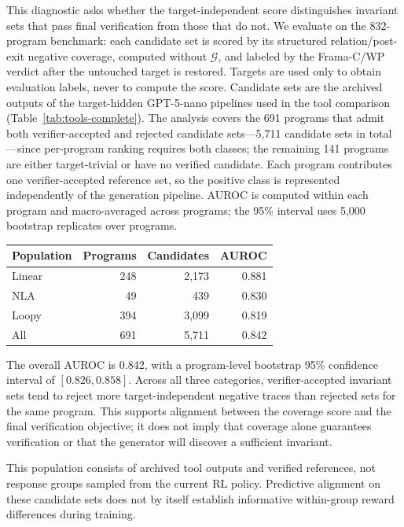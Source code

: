 This diagnostic asks whether the target-independent score distinguishes
invariant sets that pass final verification from those that do not.  We
evaluate on the 832-program benchmark: each candidate set is scored by its
structured relation/post-exit negative coverage, computed without
\(\mathcal G\), and labeled by the Frama-C/WP verdict after the untouched
target is restored.  Targets are used only to obtain evaluation labels,
never to compute the score.  Candidate sets are the archived outputs of the
target-hidden GPT-5-nano pipelines used in the tool comparison
(Table~\ref{tab:tools-complete}).  The analysis covers the 691 programs that admit both verifier-accepted and
rejected candidate sets---5,711 candidate sets in total---since per-program
ranking requires both classes; the remaining 141 programs are either
target-trivial or have no verified candidate.  Each program contributes one
verifier-accepted reference set, so the positive class is represented
independently of the generation pipeline.  AUROC is computed within each
program and macro-averaged across programs; the 95\% interval uses 5,000
bootstrap replicates over programs.

\begin{center}
\small
\setlength{\tabcolsep}{5pt}
\begin{tabular}{lrrr}
\toprule
\rowcolor{algobg}
Population & Programs & Candidates & AUROC \\
\midrule
Linear & 248 & 2,173 & 0.881 \\
NLA & 49 & 439 & 0.830 \\
Loopy & 394 & 3,099 & 0.819 \\
All & 691 & 5,711 & 0.842 \\
\bottomrule
\end{tabular}
\end{center}

The overall AUROC is 0.842, with a program-level bootstrap 95\% confidence
interval of \([0.826,0.858]\).  Across all three categories, verifier-accepted
invariant sets tend to reject more target-independent negative traces than
rejected sets for the same program.  This supports alignment between the
coverage score and the final verification objective; it does not imply that
coverage alone guarantees verification or that the generator will discover a
sufficient invariant.

This population consists of archived tool outputs and verified references,
not response groups sampled from the current RL policy.  Predictive alignment
on these candidate sets does not by itself establish informative within-group
reward differences during training.

